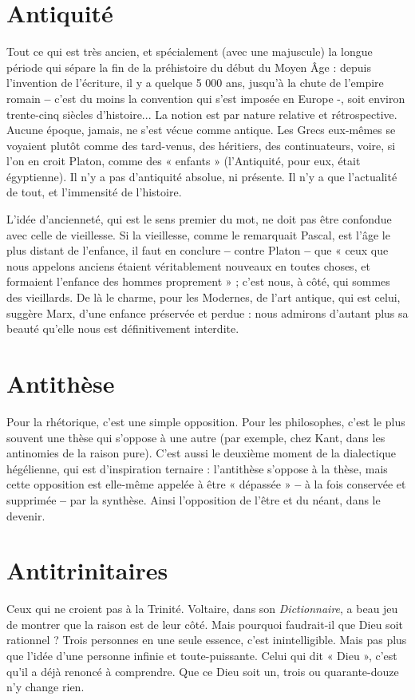 \section{Antiquité}
Tout ce qui est très ancien, et spécialement (avec une majuscule)
la longue période qui sépare la fin de la préhistoire
du début du Moyen Âge : depuis l’invention de l'écriture, il y a quelque
5 000 ans, jusqu’à la chute de l’empire romain {\bf --} c’est du moins la convention
qui s’est imposée en Europe -, soit environ trente-cinq siècles d’histoire... La
notion est par nature relative et rétrospective. Aucune époque, jamais, ne s’est
vécue comme antique. Les Grecs eux-mêmes se voyaient plutôt comme des
tard-venus, des héritiers, des continuateurs, voire, si l’on en croit Platon,
comme des « enfants » (l’Antiquité, pour eux, était égyptienne). Il n’y a pas
d’antiquité absolue, ni présente. Il n’y a que l'actualité de tout, et l’immensité
de l’histoire.

L'idée d’ancienneté, qui est le sens premier du mot, ne doit pas être confondue
avec celle de vieillesse. Si la vieillesse, comme le remarquait Pascal,
est l’âge le plus distant de l'enfance, il faut en conclure {\bf --} contre Platon {\bf --} que
« ceux que nous appelons anciens étaient véritablement nouveaux en toutes
choses, et formaient l'enfance des hommes proprement » ; c’est nous, à côté,
qui sommes des vieillards. De là le charme, pour les Modernes, de l’art
antique, qui est celui, suggère Marx, d’une enfance préservée et perdue :
nous admirons d’autant plus sa beauté qu’elle nous est définitivement interdite.

\section{Antithèse}
Pour la rhétorique, c’est une simple opposition. Pour les philosophes,
c’est le plus souvent une thèse qui s'oppose à une
autre (par exemple, chez Kant, dans les antinomies de la raison pure). C’est
aussi le deuxième moment de la dialectique hégélienne, qui est d'inspiration
ternaire : l’antithèse s'oppose à la thèse, mais cette opposition est elle-même
appelée à être « dépassée » {\bf --} à la fois conservée et supprimée {\bf --} par la synthèse.
Ainsi l’opposition de l’être et du néant, dans le devenir.

\section{Antitrinitaires}
Ceux qui ne croient pas à la Trinité. Voltaire, dans son
{\it Dictionnaire}, a beau jeu de montrer que la raison est de
leur côté. Mais pourquoi faudrait-il que Dieu soit rationnel ? Trois personnes
en une seule essence, c’est inintelligible. Mais pas plus que l’idée d’une personne
infinie et toute-puissante. Celui qui dit « Dieu », c’est qu’il a déjà renoncé à comprendre.
Que ce Dieu soit un, trois ou quarante-douze n’y change rien.

